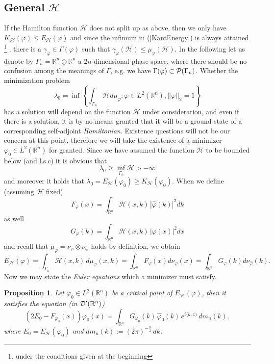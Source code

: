 \documentclass[12pt,a4paper]{article}
\newcommand{\RR}[1]{\mathbb{R}^#1}
\newcommand{\HH}{\mathcal{H}}
\newtheorem{prop}{Proposition}
\begin{document}
\subsection{General $\HH$}
If the Hamilton function $\HH$ does not split up as above, then we only have
$K_\HH(\varphi)\leq E_\HH(\varphi)$ and since the infimum in (\ref{KantEnergy})
is always attained \footnote{under the conditions given at the beginning} , there is a $\gamma_{\varphi}\in\Gamma(\varphi)$ such that
$\gamma_{\varphi}(\HH) \leq \mu_{\varphi}(\HH)$. In the following let us denote
by $\Gamma_n = {\RR n}\oplus {\RR n}$ a $2n$-dimensional phase space, where
there should be no confusion among the meanings of $\Gamma$, e.g. we 
have $\Gamma(\varphi)\subset{\cal P}(\Gamma_n)$.
Whether the minimization problem
\begin{equation}\label{eigenval0}
                 \lambda_0 = \inf \left\{ \int_{\Gamma_n} \HH d\mu_\varphi: 
                       \varphi\in L^2(\RR n), ||\varphi||_2 = 1  \right\}
\end{equation}
has a solution will depend on the function $\HH$ under
consideration, and even if there is a solution, it is by no means granted that
it will be a ground state of a corresponding self-adjoint {\sl Hamiltonian}.
Existence questions will not be our concern at this point, therefore we will
take the existence of a minimizer $\varphi_0\in L^2(\RR n)$ for granted. Since
we have assumed the function $\HH$ to be bounded below (and l.s.c) it is obvious
that 
\begin{displaymath}
                  \lambda_0 \geq \inf_{\Gamma_n} \HH > - \infty
\end{displaymath} 
and moreover it holds that $\lambda_0=E_\HH(\varphi_0)\geq K_\HH(\varphi_0)$. When we define (assuming $\HH$ fixed) 
\begin{displaymath}
        F_{\varphi}(x) = \int_{\RR n} \HH(x,k)\, |\hat\varphi(k)|^2 dk
\end{displaymath} 
as well
\begin{displaymath}
        G_{\varphi}(k) = \int_{\RR n} \HH(x,k)\, |\varphi(x)|^2 dx
\end{displaymath}
and  recall that $\mu_{\varphi}=\nu_{\varphi}\otimes\nu_{\hat\varphi}$ holds by
definition, we obtain 
\begin{displaymath}
        E_\HH(\varphi)=\int_{\Gamma_n} \HH(x,k)\, d\mu_{\varphi}(x,k) =
           \int_{\RR n} F_{\varphi}(x) d\nu_{\varphi}(x) =
           \int_{\RR n} G_{\varphi}(k) d\nu_{\hat\varphi}(k). 
\end{displaymath} 
Now we may state the {\sl Euler equations} which a minimizer must satisfy.
\begin{prop}
Let $\varphi_0\in L^2(\RR n)$ be a critical point of $E_\HH(\varphi)$, then
it satisfies the equation (in ${\cal D}'(\RR n)$)
\begin{equation}\label{EulerEq}
     \left(2 E_0 - F_{\varphi_0}(x)\right) \varphi_0(x) = 
         \int_{\RR n} G_{\varphi_0}(k)\, \hat\varphi_0(k)\, 
            e^{i\langle k,x \rangle}\, dm_n(k),
\end{equation} 
where $E_0 = E_\HH(\varphi_0)$ and $dm_n(k):=(2\pi)^{-\frac{n}{2}}\,dk$.
\end{prop}
\end{document}
